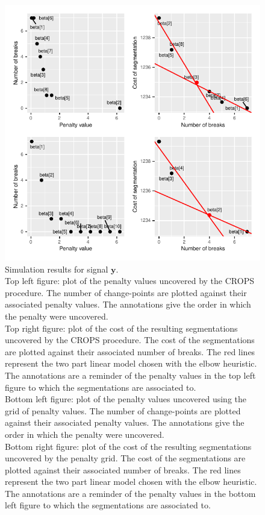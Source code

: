 \begin{figure}[htbp]
    \centering
    \includegraphics{figs/Chap4/RES_SIM_Y.pdf}
    \caption{Simulation results for signal $\bm y$. \\ 
    Top left figure: plot of the penalty values uncovered by the CROPS procedure. The number of change-points are plotted against their associated penalty values. The annotations give the order in which the penalty were uncovered. \\
    Top right figure: plot of the cost of the resulting segmentations uncovered by the CROPS procedure. The cost of the segmentations are plotted against their associated number of breaks. The red lines represent the two part linear model chosen with the elbow heuristic. The annotations are a reminder of the penalty values in the top left figure to which the segmentations are associated to. \\
    Bottom left figure: plot of the penalty values uncovered using the grid of penalty values. The number of change-points are plotted against their associated penalty values. The annotations give the order in which the penalty were uncovered. \\
    Bottom right figure: plot of the cost of the resulting segmentations uncovered by the penalty grid. The cost of the segmentations are plotted against their associated number of breaks. The red lines represent the two part linear model chosen with the elbow heuristic. The annotations are a reminder of the penalty values in the bottom left figure to which the segmentations are associated to.}
    \label{fig:res_sim_y}
\end{figure}

